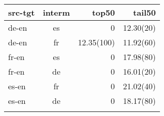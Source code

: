 \begin{tabular}{lcrr}

\toprule
src-tgt & interm & top50 & tail50 \\
\toprule

de-en & es & 0 & 12.30(20) \\
de-en & fr & 12.35(100) & 11.92(60) \\
fr-en & es & 0 & 17.98(80) \\
fr-en & de & 0 & 16.01(20) \\
es-en & fr & 0 & 21.02(40) \\
es-en & de & 0 & 18.17(80) \\
\bottomrule
\centering
\small
\label{table:eparltopn}
\end{tabular}